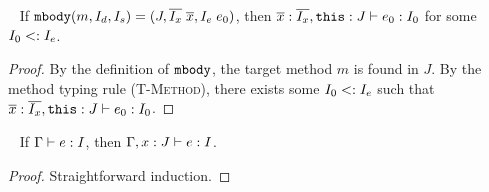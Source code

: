 \begin{lemma}~\label{lemma:return_expr_typing}
If $\texttt{mbody}(m, I_d, I_s) = (J, \overline{I_x} \; \overline{x}, I_e \; e_0)$, then
 $\overline{x}:\overline{I_x}, \texttt{this}:J \; {\vdash} \; e_0 : I_0$ for some $I_0 <: I_e$.
\end{lemma}

\begin{proof}
By the definition of $\texttt{mbody}$, the target method $m$ is found in $J$. By the method typing rule \textsc{(T-Method)}, there exists some 
$I_0 <: I_e$ such that $\overline{x}:\overline{I_x}, \texttt{this}:J \; {\vdash} \; e_0 : I_0$. 
\end{proof}

\begin{lemma}[Weakening]~\label{lemma:weakening}
	If $\Gamma \; {\vdash} \; e : I$, then $\Gamma, x : J \; {\vdash} \; e : I$.
\end{lemma}

\begin{proof}
Straightforward induction.
\end{proof}


